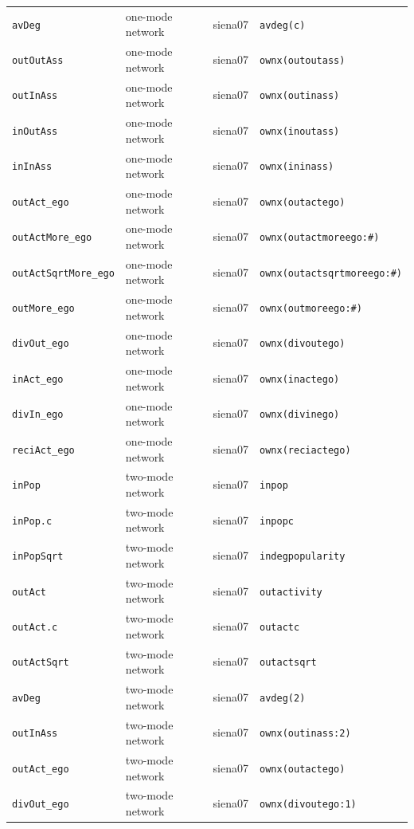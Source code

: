 \begin{longtable}{@{}p{2.6cm}p{3.2cm}p{2.9cm}p{5.4cm}@{}}
\texttt{avDeg} & one-mode network & siena07 & \texttt{avdeg(c)}\\
\texttt{outOutAss} & one-mode network & siena07 & \texttt{ownx(outoutass)}\\
\texttt{outInAss} & one-mode network & siena07 & \texttt{ownx(outinass)}\\
\texttt{inOutAss} & one-mode network & siena07 & \texttt{ownx(inoutass)}\\
\texttt{inInAss} & one-mode network & siena07 & \texttt{ownx(ininass)}\\
\texttt{outAct\_ego} & one-mode network & siena07 & \texttt{ownx(outactego)}\\
\texttt{outActMore\_ego} & one-mode network & siena07 & \texttt{ownx(outactmoreego:\#)}\\
\texttt{outActSqrtMore\_ego} & one-mode network & siena07 & \texttt{ownx(outactsqrtmoreego:\#)}\\
\texttt{outMore\_ego} & one-mode network & siena07 & \texttt{ownx(outmoreego:\#)}\\
\texttt{divOut\_ego} & one-mode network & siena07 & \texttt{ownx(divoutego)}\\
\texttt{inAct\_ego} & one-mode network & siena07 & \texttt{ownx(inactego)}\\
\texttt{divIn\_ego} & one-mode network & siena07 & \texttt{ownx(divinego)}\\
\texttt{reciAct\_ego} & one-mode network & siena07 & \texttt{ownx(reciactego)}\\
\texttt{inPop} & two-mode network & siena07 & \texttt{inpop}\\
\texttt{inPop.c} & two-mode network & siena07 & \texttt{inpopc}\\
\texttt{inPopSqrt} & two-mode network & siena07 & \texttt{indegpopularity}\\
\texttt{outAct} & two-mode network & siena07 & \texttt{outactivity}\\
\texttt{outAct.c} & two-mode network & siena07 & \texttt{outactc}\\
\texttt{outActSqrt} & two-mode network & siena07 & \texttt{outactsqrt}\\
\texttt{avDeg} & two-mode network & siena07 & \texttt{avdeg(2)}\\
\texttt{outInAss} & two-mode network & siena07 & \texttt{ownx(outinass:2)}\\
\texttt{outAct\_ego} & two-mode network & siena07 & \texttt{ownx(outactego)}\\
\texttt{divOut\_ego} & two-mode network & siena07 & \texttt{ownx(divoutego:1)}\\

\end{longtable}
